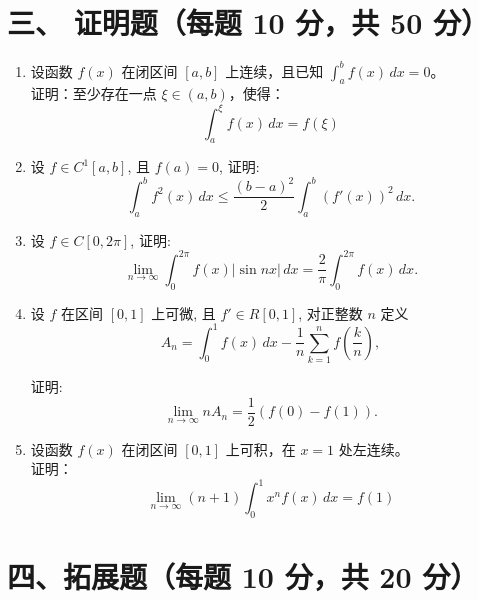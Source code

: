 \documentclass[11pt, a4paper]{article}
\begin{document}
\section*{三、 证明题（每题 10 分，共 50 分）}

\begin{enumerate}
    \item[6.] 设函数 $f(x)$ 在闭区间 $[a, b]$ 上连续，且已知 $\int_a^b f(x) \, dx = 0$。\\
    证明：至少存在一点 $\xi \in (a, b)$，使得：
    \[ \int_a^\xi f(x) \, dx = f(\xi) \]
    
    \vspace{2em}
    
    \item[7.]设 $f \in C^1[a,b]$, 且 $f(a) = 0$, 证明:
    \[
    \int_{a}^{b} f^2(x) \, dx \le \frac{(b-a)^2}{2} \int_{a}^{b} (f'(x))^2 \, dx.
    \]

    \vspace{2em}

     \item[8.] 设 $f \in C[0,2\pi]$, 证明:
    \[
    \lim_{n\to\infty} \int_{0}^{2\pi} f(x)|\sin nx| \, dx = \frac{2}{\pi} \int_{0}^{2\pi} f(x) \, dx. 
    \]

    \vspace{2em}

    \item[9.]设 $f$ 在区间 $[0,1]$ 上可微, 且 $f' \in R[0,1]$, 对正整数 $n$ 定义
    \[
    A_n = \int_{0}^{1} f(x) \, dx - \frac{1}{n} \sum_{k=1}^{n} f\left( \frac{k}{n} \right),
    \]

    证明:
    \[
    \lim_{n \to \infty} n A_n = \frac{1}{2} \left( f(0) - f(1) \right).
    \]
    

    \vspace{2em}

    \item[10.] 设函数 $f(x)$ 在闭区间 $[0, 1]$ 上可积，在 $x = 1$ 处左连续。\\
    证明：
    \[ \lim_{n \to \infty} (n+1) \int_0^1 x^n f(x) \, dx = f(1) \]
\end{enumerate}

\section*{四、拓展题（每题 10 分，共 20 分）}
\end{document}

